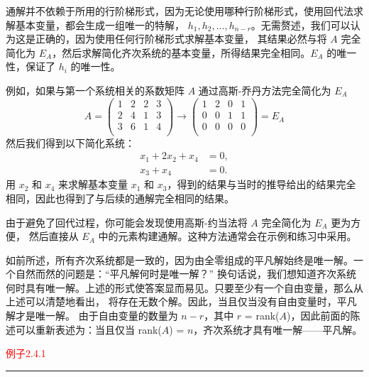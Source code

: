 通解并不依赖于所用的行阶梯形式，因为无论使用哪种行阶梯形式，使用回代法求解基本变量，都会生成一组唯一的特解，
{\(h_1, h_2, ..., h_{n-r}\)}。无需赘述，我们可以认为这是正确的，因为使用任何行阶梯形式求解基本变量，
其结果必然与将 \(A\) 完全简化为 \(E_A\)，然后求解简化齐次系统的基本变量，所得结果完全相同。\(E_A\) 的唯一性，保证了 \(h_i\) 的唯一性。

例如，如果与第一个系统相关的系数矩阵 \(A\) 通过高斯-乔丹方法完全简化为 \(E_A\)
\[
A = 
\left(\begin{array}{cccc}
    1 & 2 & 2 & 3 \\
    2 & 4 & 1 & 3 \\
    3 & 6 & 1 & 4 \\
\end{array}\right)\to
\left(\begin{array}{cccc}
    1 & 2 & 0 & 1 \\
    0 & 0 & 1 & 1 \\
    0 & 0 & 0 & 0 \\
\end{array}\right)= E_A
\]
然后我们得到以下简化系统：
\[
\begin{align}
    x_1 + 2x_2 + x_4 &= 0, \\
    x_3 + x_4 &= 0.
\end{align}
\]
用 \(x_2\) 和 \(x_4\) 来求解基本变量 \(x_1\) 和 \(x_3\)，得到的结果与当时的推导给出的结果完全相同，因此也得到了与后续的通解完全相同的结果。

由于避免了回代过程，你可能会发现使用高斯-约当法将 \(A\) 完全简化为 \(E_A\) 更为方便，
然后直接从 \(E_A\) 中的元素构建通解。这种方法通常会在示例和练习中采用。

如前所述，所有齐次系统都是一致的，因为由全零组成的平凡解始终是唯一解。一个自然而然的问题是：“平凡解何时是唯一解？”
换句话说，我们想知道齐次系统何时具有唯一解。上述的形式使答案显而易见。只要至少有一个自由变量，那么从上述可以清楚地看出，
将存在无数个解。因此，当且仅当没有自由变量时，平凡解才是唯一解。
由于自由变量的数量为 \(n - r\)，其中 \(r\) = rank(\(A\))，因此前面的陈述可以重新表述为：当且仅当 rank(\(A\)) = \(n\)，齐次系统才具有唯一解——平凡解。

\textcolor{red}{例子2.4.1}
\color{red}\rule{\textwidth}{0.4pt}\color{black}

